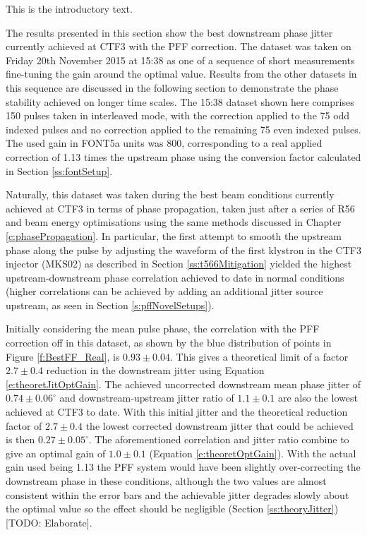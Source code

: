 
This is the introductory text.


The results presented in this section show the best downstream phase jitter currently achieved at CTF3 with the PFF correction. The dataset was taken on Friday 20th November 2015 at 15:38 as one of a sequence of short measurements fine-tuning the gain around the optimal value. Results from the other datasets in this sequence are discussed in the following section to demonstrate the phase stability achieved on longer time scales. The 15:38 dataset shown here comprises 150 pulses taken in interleaved mode, with the correction applied to the 75 odd indexed pulses and no correction applied to the remaining 75 even indexed pulses. The used gain in FONT5a units was 800, corresponding to a real applied correction of 1.13 times the upstream phase using the conversion factor calculated in Section \ref{ss:fontSetup}.

Naturally, this dataset was taken during the best beam conditions currently achieved at CTF3 in terms of phase propagation, taken just after a series of R56 and beam energy optimisations using the same methods discussed in Chapter \ref{c:phasePropagation}. In particular, the first attempt to smooth the upstream phase along the pulse by adjusting the waveform of the first klystron in the CTF3 injector (MKS02) as described in Section \ref{ss:t566Mitigation} yielded the highest upstream-downstream phase correlation achieved to date in normal conditions (higher correlations can be achieved by adding an additional jitter source upstream, as seen in Section \ref{s:pffNovelSetups}). 

Initially considering the mean pulse phase, the correlation with the PFF correction off in this dataset, as shown by the blue distribution of points in Figure \ref{f:BestFF_Real}, is \(0.93\pm0.04\). This gives a theoretical limit of a factor \(2.7\pm0.4\) reduction in the downstream jitter using Equation \ref{e:theoretJitOptGain}. The achieved uncorrected downstream mean phase jitter of \(0.74\pm0.06^\circ\) and downstream-upstream jitter ratio of \(1.1\pm0.1\) are also the lowest achieved at CTF3 to date. With this initial jitter and the theoretical reduction factor of \(2.7\pm0.4\) the lowest corrected downstream jitter that could be achieved is then \(0.27\pm0.05^\circ\). The aforementioned correlation and jitter ratio combine to give an optimal gain of \(1.0\pm0.1\) (Equation \ref{e:theoretOptGain}). With the actual gain used being 1.13 the PFF system would have been slightly over-correcting the downstream phase in these conditions, although the two values are almost consistent within the error bars and the achievable jitter degrades slowly about the optimal value so the effect should be negligible (Section \ref{ss:theoryJitter}) [TODO: Elaborate].

